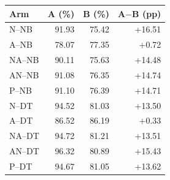 \begin{tabular}{lrrr}
\toprule
Arm & A (\%) & B (\%) & A$-$B (pp) \\
\midrule
N--NB & 91.93 & 75.42 & +16.51 \\
A--NB & 78.07 & 77.35 & +0.72 \\
NA--NB & 90.11 & 75.63 & +14.48 \\
AN--NB & 91.08 & 76.35 & +14.74 \\
P--NB & 91.10 & 76.39 & +14.71 \\
N--DT & 94.52 & 81.03 & +13.50 \\
A--DT & 86.52 & 86.19 & +0.33 \\
NA--DT & 94.72 & 81.21 & +13.51 \\
AN--DT & 96.32 & 80.89 & +15.43 \\
P--DT & 94.67 & 81.05 & +13.62 \\
\bottomrule
\end{tabular}
